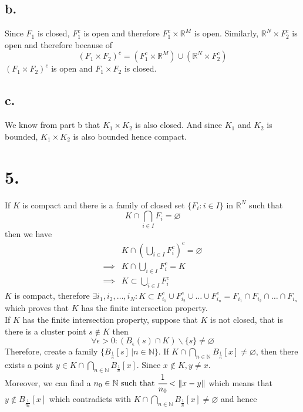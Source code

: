 \documentclass[11pt]{article}
\begin{document}
\subsection*{b.}
Since $F_1$ is closed, $F_1^c$ is open and therefore $F_1^c \times \mathbb{R}^M$ is open.
Similarly, $\mathbb{R}^N \times F_2^c$ is open and therefore because of 
\[
(F_1 \times F_2)^c = (F_1^c \times \mathbb{R}^M) \cup (\mathbb{R}^N \times F_2^c)
\]
$(F_1 \times F_2)^c$ is open and $F_1 \times F_2$ is closed.
\subsection*{c.}
We know from part b that $K_1 \times K_2$ is also closed. 
And since $K_1$ and $K_2$ is bounded, $K_1 \times K_2$ is also bounded hence compact. 

\pagebreak
\section*{5.}
If $K$ is compact and there is a family of closed set $\{ F_i: i \in I\}$ in $\mathbb{R}^N$ such that 
\[
K \cap \bigcap_{i \in I}F_i = \varnothing
\]
then we have 
\begin{equation*}
\begin{aligned}
&K \cap \left(\bigcup_{i\in I}F_i^c\right)^c = \varnothing \\
\implies & K \cap \bigcup_{i\in I}F_i^c = K \\
\implies &K \subset \bigcup_{i\in I}F_i^c
\end{aligned}
\end{equation*}
$K$ is compact, therefore $\exists i_1, i_2, \ldots, i_N: K \subset F^c_{i_1} \cup  F^c_{i_2} \cup \ldots \cup  F^c_{i_n} = F_{i_1} \cap F_{i_2} \cap \ldots \cap F_{i_n}$ which proves that $K$ has the finite intersection property. \\
If $K$ has the finite intersection property, suppose that $K$ is not closed, that is there is a cluster point $s \notin K$ then 
\[
\forall \epsilon>0: (B_\epsilon(s) \cap K) \backslash \{s\} \ne \varnothing
\]
Therefore, create a family $\{B_{\frac{1}{n}}[s] \, | n \in \mathbb{N}\}$. 
If $K \cap \bigcap_{n \in \mathbb{N}} B_{\frac{1}{n}}[x] \ne \varnothing$, then there exists a point $y \in K \cap \bigcap_{n \in \mathbb{N}} B_{\frac{1}{n}}[x]$. Since $x \notin K, y \ne x$. \\
Moreover, we can find a $n_0 \in \mathbb{N} \text{ such that } \cfrac{1}{n_0} < \|x-y\|$ which means that $y \notin B_{\frac{1}{n_0}} [x]$ which contradicts with  $K \cap \bigcap_{n \in \mathbb{N}} B_{\frac{1}{n}}[x] \ne \varnothing$ and hence  
\end{document}
